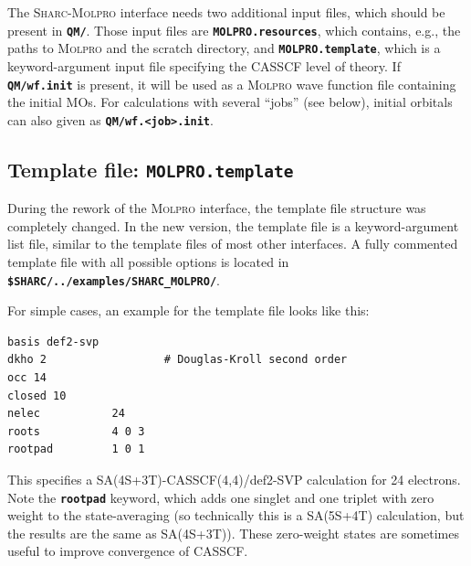 \documentclass[a4paper,10pt,DIV=15,openany]{scrbook}
\newcommand{\sharc}{\textsc{Sharc}}
\newcommand{\ttt}[1]{\textbf{\texttt{#1}}}
\newenvironment{example}{
  \setlength{\OuterFrameSep}{3pt}
  \vspace{0mm}
  \definecolor{shadecolor}{HTML}{E4F4FF}
  \begin{shaded}
}{
  \end{shaded}
}
\begin{document}
The \sharc-\textsc{Molpro} interface needs two additional input files, which should be present in \ttt{QM/}. Those input files are \ttt{MOLPRO.resources}, which contains, e.g., the paths to \textsc{Molpro} and the scratch directory, and \ttt{MOLPRO.template}, which is a keyword-argument input file specifying the CASSCF level of theory. 
If \ttt{QM/wf.init} is present, it will be used as a \textsc{Molpro} wave function file containing the initial MOs.
For calculations with several ``jobs'' (see below), initial orbitals can also given as \ttt{QM/wf.<job>.init}.

\subsection{Template file: \ttt{MOLPRO.template}}

During the rework of the \textsc{Molpro} interface, the template file structure was completely changed.
In the new version, the template file is a keyword-argument list file, similar to the template files of most other interfaces.
A fully commented template file with all possible options is located in \ttt{\$SHARC/../examples/SHARC\_MOLPRO/}.

For simple cases, an example for the template file looks like this:
\begin{example}
  \begin{verbatim}
basis def2-svp
dkho 2                  # Douglas-Kroll second order
occ 14
closed 10
nelec           24
roots           4 0 3
rootpad         1 0 1
\end{verbatim}
\end{example}
This specifies a SA(4S+3T)-CASSCF(4,4)/def2-SVP calculation for 24 electrons.
Note the \ttt{rootpad} keyword, which adds one singlet and one triplet with zero weight to the state-averaging (so technically this is a SA(5S+4T) calculation, but the results are the same as SA(4S+3T)).
These zero-weight states are sometimes useful to improve convergence of CASSCF.
\end{document}
